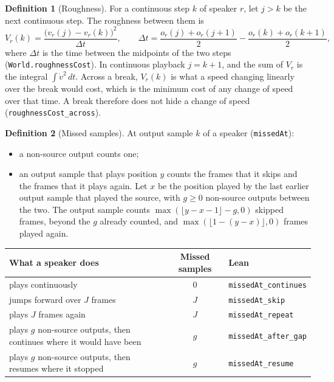 \documentclass[11pt,a4paper]{article}
\newcommand{\lean}[1]{\texttt{#1}}
\theoremstyle{definition}
\newtheorem{definition}{Definition}[section]
\begin{document}
\begin{definition}[Roughness]\label{def:roughness}
For a continuous step $k$ of speaker $r$, let $j > k$ be the next
continuous step. The roughness between them is
\[
  V_r(k) = \frac{\bigl(v_r(j) - v_r(k)\bigr)^2}{\Delta t},\qquad
  \Delta t = \frac{o_r(j) + o_r(j+1)}{2} - \frac{o_r(k) + o_r(k+1)}{2},
\]
where $\Delta t$ is the time between the midpoints of the two steps
(\lean{World.roughnessCost}). In continuous playback $j = k + 1$, and the
sum of $V_r$ is the integral $\int \dot v^2\,dt$. Across a break, $V_r(k)$ is
what a speed changing linearly over the break would cost, which is the
minimum cost of any change of speed over that time. A break therefore does
not hide a change of speed (\lean{roughnessCost\_across}).
\end{definition}

\begin{definition}[Missed samples]
At output sample $k$ of a speaker (\lean{missedAt}):
\begin{itemize}
\item a non-source output counts one;
\item an output sample that plays position $y$ counts the frames that it
  skips and the frames that it plays again. Let $x$ be the position played
  by the last earlier output sample that played the source, with $g \ge 0$
  non-source outputs between the two. The output sample counts
  $\max(\lfloor y - x - 1 \rfloor - g, 0)$ skipped frames, beyond the $g$
  already counted, and $\max(\lfloor 1 - (y - x) \rfloor, 0)$ frames played
  again.
\end{itemize}
\end{definition}

\begin{center}
\small
\begin{tabular}{@{}p{}cl@{}}
\toprule
What a speaker does & Missed samples & Lean \\
\midrule
plays continuously & $0$ & \lean{missedAt\_continues} \\
jumps forward over $J$ frames & $J$ & \lean{missedAt\_skip} \\
plays $J$ frames again & $J$ & \lean{missedAt\_repeat} \\
plays $g$ non-source outputs, then continues where it would have been & $g$ & \lean{missedAt\_after\_gap} \\
plays $g$ non-source outputs, then resumes where it stopped & $g$ & \lean{missedAt\_resume} \\
\bottomrule
\end{tabular}
\end{center}
\end{document}
